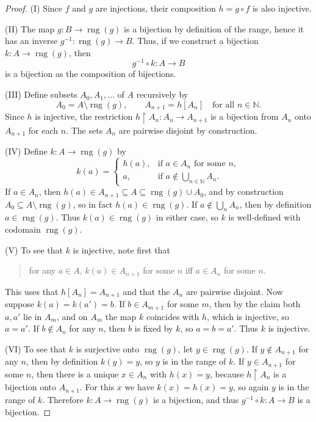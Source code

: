 \documentclass[answers,12pt,addpoints]{exam}
\begin{document}
\begin{proof}
(I) Since $f$ and $g$ are injections, their composition $h = g \circ f$ is also injective.

(II) The map $g : B \to \operatorname{rng}(g)$ is a bijection by definition of the range,
hence it has an inverse $g^{-1} : \operatorname{rng}(g) \to B$. Thus, if we construct
a bijection $k : A \to \operatorname{rng}(g)$, then
\[
g^{-1} \circ k : A \to B
\]
is a bijection as the composition of bijections.

(III) Define subsets $A_0, A_1, \dots$ of $A$ recursively by
\[
A_0 = A \setminus \operatorname{rng}(g), \qquad A_{n+1} = h[A_n] \quad\text{for all } n \in \mathbb{N}.
\]
Since $h$ is injective, the restriction $h \upharpoonright A_n : A_n \to A_{n+1}$ is a bijection
from $A_n$ onto $A_{n+1}$ for each $n$. The sets $A_n$ are pairwise disjoint by construction.

(IV) Define $k : A \to \operatorname{rng}(g)$ by
\[
k(a) =
\begin{cases}
h(a), & \text{if } a \in A_n \text{ for some } n,\\[4pt]
a,    & \text{if } a \notin \bigcup_{n \in \mathbb{N}} A_n.
\end{cases}
\]
If $a \in A_n$, then $h(a) \in A_{n+1} \subseteq A \subseteq \operatorname{rng}(g) \cup A_0$,
and by construction $A_0 \subseteq A \setminus \operatorname{rng}(g)$, so in fact $h(a) \in \operatorname{rng}(g)$.
If $a \notin \bigcup_n A_n$, then by definition $a \in \operatorname{rng}(g)$. Thus
$k(a) \in \operatorname{rng}(g)$ in either case, so $k$ is well-defined with codomain $\operatorname{rng}(g)$.

(V) To see that $k$ is injective, note first that
\begin{quote}
for any $a \in A$, $k(a) \in A_{n+1}$ for some $n$ iff $a \in A_n$ for some $n$.
\end{quote}
This uses that $h[A_n] = A_{n+1}$ and that the $A_n$ are pairwise disjoint. Now suppose
$k(a) = k(a') = b$. If $b \in A_{m+1}$ for some $m$, then by the claim both $a,a'$ lie in $A_m$,
and on $A_m$ the map $k$ coincides with $h$, which is injective, so $a=a'$.
If $b \notin A_n$ for any $n$, then $b$ is fixed by $k$, so $a = b = a'$.
Thus $k$ is injective.

(VI) To see that $k$ is surjective onto $\operatorname{rng}(g)$, let $y \in \operatorname{rng}(g)$.
If $y \notin A_{n+1}$ for any $n$, then by definition $k(y) = y$, so $y$ is in the range of $k$.
If $y \in A_{n+1}$ for some $n$, then there is a unique $x \in A_n$ with $h(x) = y$,
because $h \upharpoonright A_n$ is a bijection onto $A_{n+1}$. For this $x$ we have
$k(x) = h(x) = y$, so again $y$ is in the range of $k$. Therefore $k : A \to \operatorname{rng}(g)$
is a bijection, and thus $g^{-1} \circ k : A \to B$ is a bijection.


\end{proof}
\end{document}
